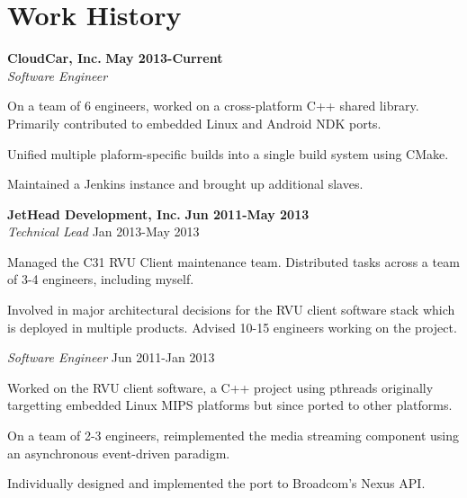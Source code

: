 \section{Work History}
\begin{lonelist}

\item[] \textbf{CloudCar, Inc.} \hfill \textbf{May 2013-Current}\\
  \textit{Software Engineer}
  \begin{innerlist}
  \item On a team of 6 engineers, worked on a cross-platform C++ shared
      library. Primarily contributed to embedded Linux and Android NDK ports.
  \item Unified multiple plaform-specific builds into a single build system
      using CMake.
  \item Maintained a Jenkins instance and brought up additional slaves.
  \end{innerlist}

\item[] \textbf{JetHead Development, Inc.} \hfill \textbf{Jun 2011-May 2013}\\
  \textit{Technical Lead} \hfill Jan 2013-May 2013
  \begin{innerlist}
  \item Managed the C31 RVU Client maintenance team. Distributed tasks across a
      team of 3-4 engineers, including myself.

  \item Involved in major architectural decisions for the RVU client software
      stack which is deployed in multiple products. Advised 10-15 engineers
      working on the project.
  \end{innerlist}

\item[]%
  \textit{Software Engineer} \hfill Jun 2011-Jan 2013
  \begin{innerlist}
  \item Worked on the RVU client software, a C++ project using pthreads
      originally targetting embedded Linux MIPS platforms but since ported to
      other platforms.

  \item On a team of 2-3 engineers, reimplemented the media streaming component
      using an asynchronous event-driven paradigm.

  \item Individually designed and implemented the port to Broadcom's Nexus API.


\end{innerlist}
\end{lonelist}
